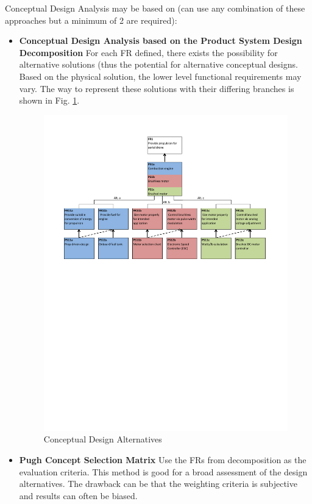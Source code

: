 \documentclass{other/docTemplate}
\begin{document}
Conceptual Design Analysis may be based on (can use any combination of these approaches but a minimum of 2 are required):
\begin{itemize}

\item \textbf{Conceptual Design Analysis based on the Product System Design Decomposition}
 For each FR defined, there exists the possibility for alternative solutions (thus the potential for alternative conceptual designs. Based on the physical solution, the lower level functional requirements may vary. The way to represent these solutions with their differing branches is shown in Fig. \ref{Alternatives_Tree}.
\begin{figure}[ht!]
\centering
\includegraphics[width=.99\textwidth,]{alternative_tree.pdf}
\caption{Conceptual Design Alternatives}
\label{Alternatives_Tree}
\end{figure}

  \item \textbf{Pugh Concept Selection Matrix} Use the FRs from decomposition as the evaluation criteria. This method is good for a broad assessment of the design alternatives. The drawback can be that the weighting criteria is subjective and results can often be biased.
 


\end{itemize}
\end{document}
